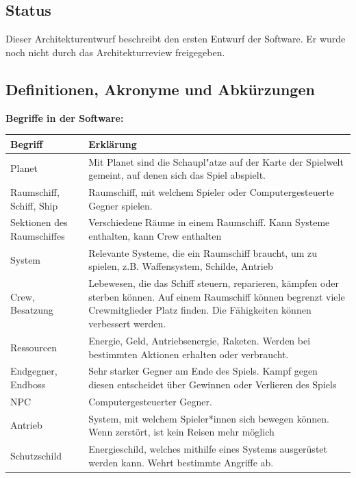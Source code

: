 \documentclass[fontsize=12pt,paper=a4,twoside]{scrartcl}
\begin{document}
\subsection{Status}

Dieser Architekturentwurf beschreibt den ersten Entwurf der Software. Er wurde noch nicht durch das Architekturreview freigegeben. 
  
\subsection{Definitionen, Akronyme und Abkürzungen}

\textbf{Begriffe in der Software:}
\begin{center}
\begin{tabular}{|p{3cm}|p{12cm}|}
\hline
Begriff & Erklärung \\ \hline
Planet & Mit Planet sind die Schaupl"atze auf der Karte der Spielwelt gemeint, auf denen sich das Spiel abspielt. \\ \hline
Raumschiff, Schiff, Ship & Raumschiff, mit welchem Spieler oder Computergesteuerte Gegner spielen. \\ \hline
Sektionen des Raumschiffes & Verschiedene Räume in einem Raumschiff. Kann Systeme enthalten, kann Crew enthalten\\ \hline
System & Relevante Systeme, die ein Raumschiff braucht, um zu spielen, z.B. Waffensystem, Schilde, Antrieb \\ \hline
Crew, Besatzung & Lebewesen, die das Schiff steuern, reparieren, kämpfen oder sterben können. Auf einem Raumschiff können begrenzt viele Crewmitglieder Platz finden. Die Fähigkeiten können verbessert werden. \\ \hline
Ressourcen & Energie, Geld, Antriebsenergie, Raketen. Werden bei bestimmten Aktionen erhalten oder verbraucht. \\ \hline
Endgegner, Endboss & Sehr starker Gegner am Ende des Spiels. Kampf gegen diesen entscheidet über Gewinnen oder Verlieren des Spiels \\ \hline  
NPC & Computergesteuerter Gegner.\\ \hline
Antrieb & System, mit welchem Spieler*innen sich bewegen können. Wenn zerstört, ist kein Reisen mehr möglich\\ \hline
Schutzschild & Energieschild, welches mithilfe eines Systems ausgerüstet werden kann. Wehrt bestimmte Angriffe ab. \\ \hline

\end{tabular}
\end{center}
\end{document}
